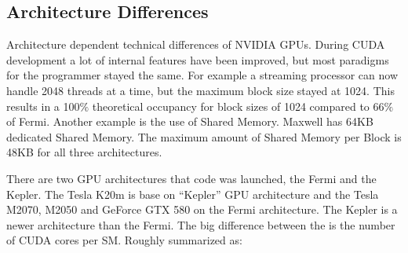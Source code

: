   
\subsection{Architecture Differences}

  Architecture dependent technical differences of NVIDIA GPUs. During CUDA development a lot of internal features have been improved, but most paradigms for the programmer stayed the same. For example a streaming processor can now handle 2048 threads at a time, but the maximum block size stayed at 1024. This results in a 100$\%$ theoretical occupancy for block sizes of 1024 compared to 66$\%$ of Fermi. Another example is the use of Shared Memory. Maxwell has 64KB dedicated Shared Memory. The maximum amount of Shared Memory per Block is 48KB for all three architectures. \cite{hoermanngpu}
  
  There are two GPU architectures that code was launched, the Fermi and the Kepler. The Tesla K20m is base on ``Kepler'' GPU architecture and the Tesla M2070, M2050 and GeForce GTX 580 on the Fermi architecture. The Kepler is a newer architecture than the Fermi. The big difference between the is the number of CUDA cores per SM. Roughly summarized as:
  
